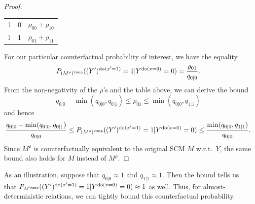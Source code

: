 \begin{proof}
\begin{center}
\begin{tabular}{ccl}
    1   & 0   & $\rho_{00} + \rho_{10}$ \\ %
    1   & 1   & $\rho_{01} + \rho_{11}$ \\ %
  \end{tabular}\end{center}
For our particular counterfactual probability of interest, we have the equality
  $$P_{(M^{\rho})^\twin}((Y')^{\doit(x'=1)} = 1 | Y^{\doit(x=0)}=0) = \frac{\rho_{01}}{q_{0|0}}.$$
From the non-negativity of the $\rho$'s and the table above, we can derive the bound
$$q_{0|0} - \min(q_{0|0},q_{0|1}) \le \rho_{01} \le \min(q_{0|0},q_{1|1})$$
and hence
$$\frac{q_{0|0} - \min(q_{0|0},q_{0|1})}{q_{0|0}} \le P_{(M^{\rho})^\twin}((Y')^{\doit(x'=1)} = 1 | Y^{\doit(x=0)}=0) \le \frac{\min(q_{0|0},q_{1|1})}{q_{0|0}}.$$
Since $M^\rho$ is counterfactually equivalent to the original SCM $M$ w.r.t.\ $Y$, the same bound also holds for $M$ instead of $M^\rho$.
\end{proof}
As an illustration, suppose that $q_{0|0} \approx 1$ and $q_{1|1} \approx 1$.
Then the bound tells us that $P_{M^\twin}((Y')^{\doit(x'=1)} = 1 | Y^{\doit(x=0)}=0) \approx 1$ as well.
Thus, for almost-deterministic relations, we can tightly bound this counterfactual probability.

